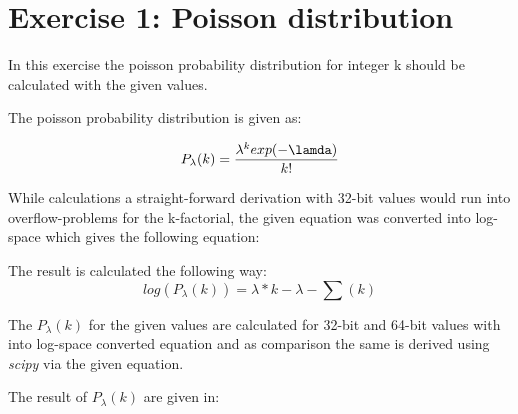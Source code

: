\section{Exercise 1: Poisson distribution}

In this exercise the poisson probability distribution for integer k should be calculated with the given values.

The poisson probability distribution is given as:

\begin{equation}
	P_{\lambda}(k) = \frac{\lambda^k exp(-\lamda)}{k!}
\end{equation}

While calculations a straight-forward derivation with 32-bit values would run into overflow-problems for the k-factorial, the given equation was converted into log-space which gives the following equation:
 
The result is calculated the following way:
\begin{equation}
	log(P_{\lambda}(k)) = \lambda *k - \lambda - \sum(k)
\end{equation}

The $P_{\lambda}(k)$ for the given values are calculated for 32-bit and 64-bit values with into log-space converted equation and as comparison the same is derived using \textit{scipy} via the given equation. 



The result of $P_{\lambda}(k)$ are given in:


